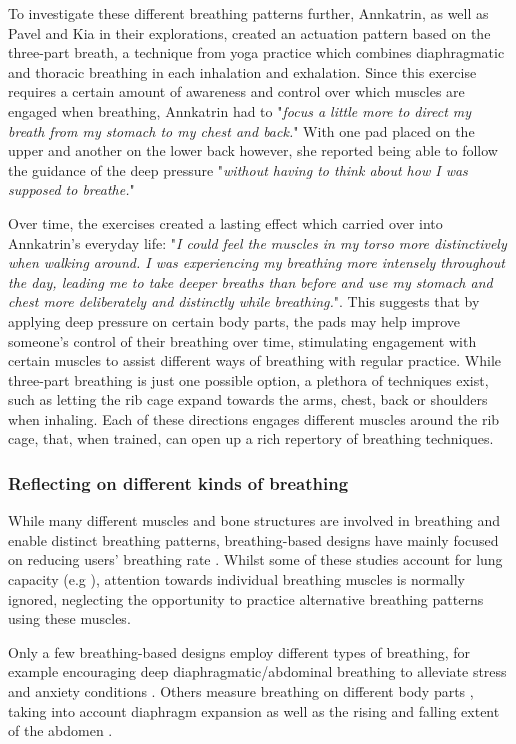 To investigate these different breathing patterns further, Annkatrin, as well as Pavel and Kia in their explorations, created an actuation pattern based on the three-part breath, a technique from yoga practice which combines diaphragmatic and thoracic breathing in each inhalation and exhalation. Since this exercise requires a certain amount of awareness and control over which muscles are engaged when breathing, Annkatrin had to "\textit{focus a little more to direct my breath from my stomach to my chest and back.}" With one pad placed on the upper and another on the lower back however, she reported being able to follow the guidance of the deep pressure "\textit{without having to think about how I was supposed to breathe.}"

Over time, the exercises created a lasting effect which carried over into Annkatrin's everyday life: "\textit{I could feel the muscles in my torso more distinctively when walking around. I was experiencing my breathing more intensely throughout the day, leading me to take deeper breaths than before and use my stomach and chest more deliberately and distinctly while breathing.}". This suggests that by applying deep pressure on certain body parts, the pads may help improve someone's control of their breathing over time, stimulating engagement with certain muscles to assist different ways of breathing with regular practice. While three-part breathing is just one possible option, a plethora of techniques exist, such as letting the rib cage expand towards the arms, chest, back or shoulders when inhaling. Each of these directions engages different muscles around the rib cage, that, when trained, can open up a rich repertory of breathing techniques. 
% 

\subsubsection{Reflecting on different kinds of breathing}

While many different muscles and bone structures are involved in breathing and enable distinct breathing patterns, breathing-based designs have mainly focused on reducing users' breathing rate \cite{prpa_inhaling_2020}. Whilst some of these studies account for lung capacity (e.g \cite{abushakra_augmenting_2014}), attention towards individual breathing muscles is normally ignored, neglecting the opportunity to practice alternative breathing patterns using these muscles.

Only a few breathing-based designs employ different types of breathing, for example encouraging deep diaphragmatic/abdominal breathing to alleviate stress \cite{prpa_hacking_2016} and anxiety conditions \cite{van_rooij_deep_2016}. Others measure breathing on different body parts \cite{prpa_attending_2018}, taking into account diaphragm expansion \cite{desnoyers-stewart_jel:_2019} as well as the rising and falling extent of the abdomen \cite{schnadelbach_exobuilding:_2012}. 

